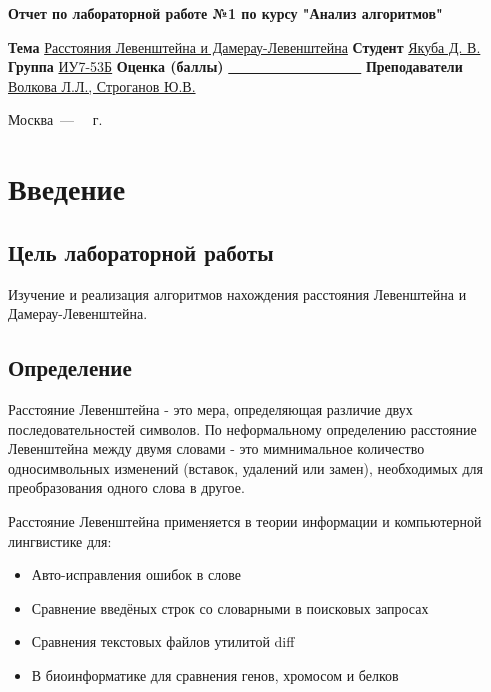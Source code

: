 \documentclass[12pt]{report}
\begin{document}
\begin{titlepage}
	
	\begin{center}
		\Large\textbf{Отчет по лабораторной работе №1 по курсу "Анализ алгоритмов"}\newline
	\end{center}
	
	\noindent\textbf{Тема} \underline{Расстояния Левенштейна и Дамерау-Левенштейна}\newline\newline\newline
	\noindent\textbf{Студент} \underline{Якуба Д. В.}\newline\newline
	\noindent\textbf{Группа} \underline{ИУ7-53Б}\newline\newline
	\noindent\textbf{Оценка (баллы)} \underline{~~~~~~~~~~~~~~~~~~~}\newline\newline
	\noindent\textbf{Преподаватели} \underline{Волкова Л.Л., Строганов Ю.В.}\newline
	
	\begin{center}
		\vfill
		Москва~---~\the\year
		~г.
	\end{center}
\end{titlepage}

\tableofcontents

\newpage
\chapter*{Введение}
\section*{Цель лабораторной работы}
Изучение и реализация алгоритмов нахождения расстояния Левенштейна и Дамерау-Левенштейна.
\section*{Определение}
Расстояние Левенштейна - это мера, определяющая различие двух последовательностей символов. По неформальному определению расстояние Левенштейна между двумя словами - это мимнимальное количество односимвольных изменений (вставок, удалений или замен), необходимых для преобразования одного слова в другое.

Расстояние Левенштейна применяется в теории информации и компьютерной лингвистике для:

\begin{itemize}
	\item Авто-исправления ошибок в слове
	\item Сравнение введёных строк со словарными в поисковых запросах
	\item Сравнения текстовых файлов утилитой diff
	\item В биоинформатике для сравнения генов, хромосом и белков
\end{itemize}
\end{document}
